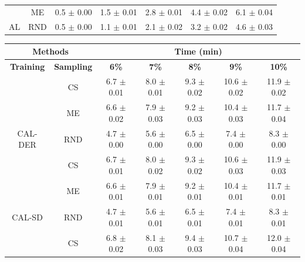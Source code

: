 \begin{table}[htbp]
\begin{tabular*}{\linewidth}{c|c|@{\extracolsep{\fill}}ccccc}
 & ME & 0.5 $\pm$ {\small 0.00} & 1.5 $\pm$ {\small 0.01} & 2.8 $\pm$ {\small 0.01} & 4.4 $\pm$ {\small 0.02} & 6.1 $\pm$ {\small 0.04}\\

\multirow{-3}{*}{\raggedright\arraybackslash AL} & RND & 0.5 $\pm$ {\small 0.00} & 1.1 $\pm$ {\small 0.01} & 2.1 $\pm$ {\small 0.02} & 3.2 $\pm$ {\small 0.02} & 4.6 $\pm$ {\small 0.03}\\
\bottomrule
\end{tabular*}
\vspace{0.5em}

\begin{tabular*}{\linewidth}{c|c|@{\extracolsep{\fill}}ccccc}
\toprule
\multicolumn{2}{c|}{\textbf{Methods}} & \multicolumn{5}{c}{\textbf{Time (min)}} \\
\midrule
\textbf{Training} & \textbf{Sampling} & \textbf{6\%} & \textbf{7\%} & \textbf{8\%} & \textbf{9\%} & \textbf{10\%}\\
\midrule
 & CS & 6.7 $\pm$ {\small 0.01} & 8.0 $\pm$ {\small 0.01} & 9.3 $\pm$ {\small 0.02} & 10.6 $\pm$ {\small 0.02} & 11.9 $\pm$ {\small 0.02}\\

 & ME & 6.6 $\pm$ {\small 0.02} & 7.9 $\pm$ {\small 0.03} & 9.2 $\pm$ {\small 0.03} & 10.4 $\pm$ {\small 0.03} & 11.7 $\pm$ {\small 0.04}\\

\multirow{-3}{*}{\raggedright\arraybackslash CAL-DER} & RND & 4.7 $\pm$ {\small 0.00} & 5.6 $\pm$ {\small 0.00} & 6.5 $\pm$ {\small 0.00} & 7.4 $\pm$ {\small 0.00} & 8.3 $\pm$ {\small 0.00}\\
\midrule
 & CS & 6.7 $\pm$ {\small 0.01} & 8.0 $\pm$ {\small 0.02} & 9.3 $\pm$ {\small 0.02} & 10.6 $\pm$ {\small 0.03} & 11.9 $\pm$ {\small 0.03}\\

 & ME & 6.6 $\pm$ {\small 0.01} & 7.9 $\pm$ {\small 0.01} & 9.2 $\pm$ {\small 0.01} & 10.4 $\pm$ {\small 0.01} & 11.7 $\pm$ {\small 0.01}\\

\multirow{-3}{*}{\raggedright\arraybackslash CAL-SD} & RND & 4.7 $\pm$ {\small 0.01} & 5.6 $\pm$ {\small 0.01} & 6.5 $\pm$ {\small 0.01} & 7.4 $\pm$ {\small 0.01} & 8.3 $\pm$ {\small 0.01}\\
\midrule
 & CS & 6.8 $\pm$ {\small 0.02} & 8.1 $\pm$ {\small 0.03} & 9.4 $\pm$ {\small 0.03} & 10.7 $\pm$ {\small 0.04} & 12.0 $\pm$ {\small 0.04}\\


\end{tabular*}
\end{table}
